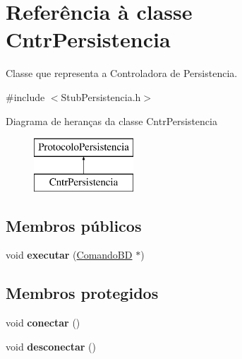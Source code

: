 \hypertarget{class_cntr_persistencia}{
\section{\-Referência à classe \-Cntr\-Persistencia}
\label{class_cntr_persistencia}
}


\-Classe que representa a \-Controladora de \-Persistencia.  




{\ttfamily \#include $<$\-Stub\-Persistencia.\-h$>$}

\-Diagrama de heranças da classe \-Cntr\-Persistencia\begin{figure}[H]
\begin{center}
\leavevmode
\includegraphics[height=2.000000cm]{class_cntr_persistencia}
\end{center}
\end{figure}
\subsection*{\-Membros públicos}
\begin{DoxyCompactItemize}
\item 
\hypertarget{class_cntr_persistencia_aee7b704d32eae58ec3fac93981fe1961}{
void {\bfseries executar} (\hyperlink{class_comando_b_d}{\-Comando\-B\-D} $\ast$)}
\label{class_cntr_persistencia_aee7b704d32eae58ec3fac93981fe1961}

\end{DoxyCompactItemize}
\subsection*{\-Membros protegidos}
\begin{DoxyCompactItemize}
\item 
\hypertarget{class_cntr_persistencia_a1763c6028405383f68414428abe6cc73}{
void {\bfseries conectar} ()}
\label{class_cntr_persistencia_a1763c6028405383f68414428abe6cc73}

\item 
\hypertarget{class_cntr_persistencia_a5a61cbfa94873536b8fe4fdb14812f80}{
void {\bfseries desconectar} ()}
\label{class_cntr_persistencia_a5a61cbfa94873536b8fe4fdb14812f80}

\end{DoxyCompactItemize}
